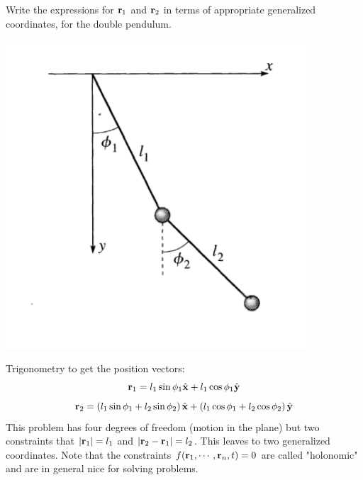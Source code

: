 \begin{p}
Write the expressions for $\mathbf{r}_1$ and $\mathbf{r}_2$ in terms of appropriate generalized coordinates, for the double pendulum. 
\begin{center}
    \includegraphics[scale=0.6]{Lecture-3/W3-img2.png}
\end{center}
\end{p}
\begin{s}
Trigonometry to get the position vectors:
\[\mathbf{r}_1 = l_1\sin\phi_1\hat{\mathbf{x}} + l_1\cos\phi_1\hat{\mathbf{y}}\]
\[\mathbf{r}_2 = \left(l_1\sin\phi_1 + l_2\sin\phi_2\right)\hat{\mathbf{x}} + \left(l_1\cos\phi_1 + l_2\cos\phi_2\right)\hat{\mathbf{y}}\]
This problem has four degrees of freedom (motion in the plane) but two constraints that $\abs{\mathbf{r}_1} = l_1$ and $\abs{\mathbf{r}_2 - \mathbf{r}_1} = l_2$. This leaves to two generalized coordinates. Note that the constraints $f(\mathbf{r}_1, \cdots, \mathbf{r}_n, t) = 0$ are called "holonomic" and are in general nice for solving problems.
\end{s}